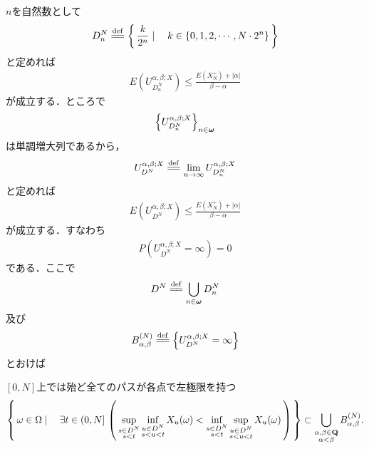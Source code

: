  	$n$を自然数として
 	\begin{align}
 		D_n^N \defeq \Set{\frac{k}{2^n}}{k \in \{0,1,2,\cdots,N \cdot 2^n\}}
 	\end{align}
 	と定めれば
 	\begin{align}
 		E\left( U_{D_n^N}^{\alpha,\beta;X} \right) \leq \frac{E(X_N^+) + |\alpha|}{\beta - \alpha}
 	\end{align}
 	が成立する．ところで
 	\begin{align}
 		\left\{U_{D_n^N}^{\alpha,\beta;X}\right\}_{n \in {\boldsymbol \omega}}
 	\end{align}
 	は単調増大列であるから，
 	\begin{align}
 		U_{D^N}^{\alpha,\beta;X} \defeq \lim_{n \to \infty} U_{D_n^N}^{\alpha,\beta;X}
 	\end{align}
 	と定めれば
 	\begin{align}
 		E\left( U_{D^N}^{\alpha,\beta;X} \right) \leq \frac{E(X_N^+) + |\alpha|}{\beta - \alpha}
 	\end{align}
 	が成立する．すなわち
 	\begin{align}
 		P\left(U_{D^N}^{\alpha,\beta;X} = \infty\right) = 0
 	\end{align}
 	である．ここで
 	\begin{align}
 		D^N \defeq \bigcup_{n \in \Natural} D_n^N
 	\end{align}
 	及び
 	\begin{align}
 		B_{\alpha,\beta}^{(N)} \defeq \left\{ U_{D^N}^{\alpha,\beta;X} = \infty \right\}
 	\end{align}
 	とおけば
 	
 	\begin{itembox}[l]{$[0,N]$上では殆ど全てのパスが各点で左極限を持つ}
 		\begin{align}
 			\left\{\, \omega \in \Omega \mid \quad \exists t \in (0,N]\, \left(\, 
 			\operatorname*{sup}_{\substack{s \in D^N \\ s < t}} \operatorname*{inf}_{\substack{u \in D^N \\ s < u < t}} X_u(\omega) 
 			< \operatorname*{inf}_{\substack{s \in D^N \\ s < t}} \operatorname*{sup}_{\substack{u \in D^N \\ s < u < t}} X_u(\omega)\, \right)\, \right\}
 			\subset \bigcup_{\substack{\alpha,\beta \in \mathbf{Q} \\ \alpha < \beta}} B_{\alpha,\beta}^{(N)}.
 		\end{align}
 	\end{itembox}
 	
